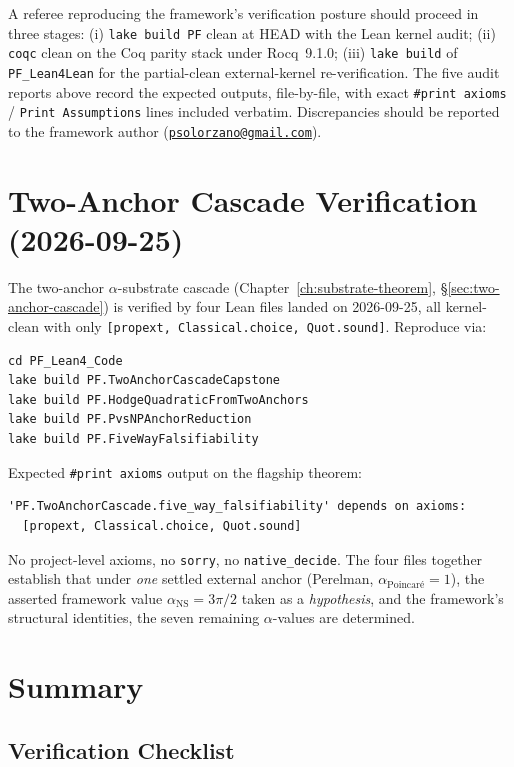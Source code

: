 \begin{remark}
A referee reproducing the framework's verification posture should
proceed in three stages: (i) \texttt{lake build PF} clean at
HEAD with the Lean kernel audit; (ii) \texttt{coqc} clean on the
Coq parity stack under Rocq~9.1.0; (iii) \texttt{lake build} of
\texttt{PF\_Lean4Lean} for the partial-clean external-kernel
re-verification. The five audit reports above record the
expected outputs, file-by-file, with exact \texttt{\#print
axioms} / \texttt{Print Assumptions} lines included verbatim.
Discrepancies should be reported to the framework author
(\href{mailto:psolorzano@gmail.com}{\texttt{psolorzano@gmail.com}}).
\end{remark}

\section{Two-Anchor Cascade Verification (2026-09-25)}
\label{sec:two-anchor-verification}

The two-anchor $\alpha$-substrate cascade
(Chapter~\ref{ch:substrate-theorem}, \S\ref{sec:two-anchor-cascade}) is
verified by four Lean files landed on 2026-09-25, all kernel-clean with
only \texttt{[propext, Classical.choice, Quot.sound]}. Reproduce via:
\begin{verbatim}
cd PF_Lean4_Code
lake build PF.TwoAnchorCascadeCapstone
lake build PF.HodgeQuadraticFromTwoAnchors
lake build PF.PvsNPAnchorReduction
lake build PF.FiveWayFalsifiability
\end{verbatim}
Expected \texttt{\#print axioms} output on the flagship theorem:
\begin{verbatim}
'PF.TwoAnchorCascade.five_way_falsifiability' depends on axioms:
  [propext, Classical.choice, Quot.sound]
\end{verbatim}
No project-level axioms, no \texttt{sorry}, no \texttt{native\_decide}.
The four files together establish that under \emph{one} settled
external anchor (Perelman, $\alpha_{\text{Poincar\'e}} = 1$), the asserted
framework value $\alpha_{\text{NS}} = 3\pi/2$ taken as a \emph{hypothesis}, and
the framework's structural identities, the seven remaining $\alpha$-values are
determined.

\section{Summary}
\label{sec:summary-ch30}

\subsection{Verification Checklist}


